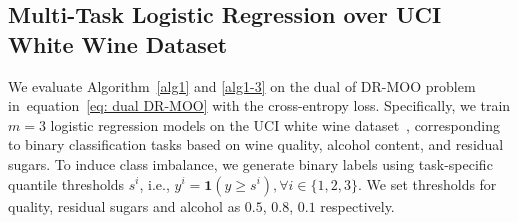 \documentclass[twoside]{article} %
\def\eqref#1{equation~\ref{#1}}
\theoremstyle{plain}
\theoremstyle{definition}
\theoremstyle{remark}
\begin{document}
\begin{table}[t]
    \centering
    
    \setlength{\tabcolsep}{5pt}
    \caption{Balanced-gradient norm over 100 random seeds. For each seed, the
    metric is averaged over the final 20 iterations. Lower values are better.
    The intervals are two-sided 90\% Student-$t$ confidence intervals.}
    \label{tab:regression-gradient-results}
\end{table}
\subsection{Multi-Task Logistic Regression over UCI White Wine Dataset}
We evaluate Algorithm~\ref{alg1} and \ref{alg1-3} on the dual of DR-MOO problem in~\eqref{eq: dual DR-MOO} with the cross-entropy loss. Specifically, we train $m=3$ logistic regression models on the UCI white wine dataset~\citep{uci-dataset}, corresponding to binary classification tasks based on wine quality, alcohol content, and residual sugars. To induce class imbalance, we generate binary labels using task-specific quantile thresholds $s^i$, i.e., $y^i=\mathbf{1}(y\geq s^i),\forall i\in \{1,2,3\}$. We set thresholds for quality, residual sugars and alcohol as $0.5$, $0.8$, $0.1$ respectively. 
\end{document}
